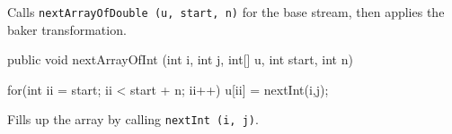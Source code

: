 \begin{tabb} Calls \texttt{nextArrayOfDouble (u, start, n)} for the base stream,
  then applies the baker transformation.
\end{tabb}
\begin{htmlonly}
\end{htmlonly}
\begin{code}

   public void nextArrayOfInt (int i, int j, int[] u, int start, int n) \begin{hide} {
      for(int ii = start; ii < start + n; ii++)
         u[ii] = nextInt(i,j);
   }\end{hide}
\end{code} 
\begin{tabb} Fills up the array by calling \texttt{nextInt (i, j)}.
\end{tabb}
\begin{htmlonly}
\end{htmlonly}
\begin{code}
\begin{hide}
}
\end{hide}
\end{code}
